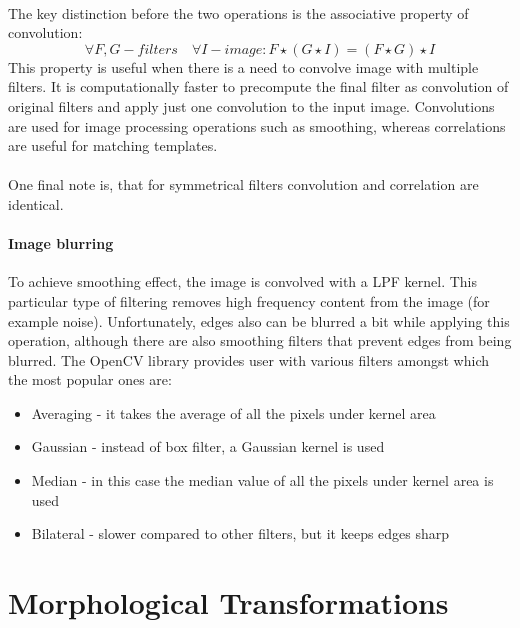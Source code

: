 \paragraph{}
The key distinction before the two operations is the associative property of convolution:
\begin{equation}
	\forall F, G - filters \quad \forall I - image: F \star (G \star I) = (F \star G) \star I
\end{equation}
This property is useful when there is a need to convolve image with multiple filters. It is computationally faster to precompute the final filter as convolution of original filters and apply just one convolution to the input image. Convolutions are used for image processing operations such as smoothing, whereas correlations are useful for matching templates.

\paragraph{}
One final note is, that for symmetrical filters convolution and correlation are identical.

\paragraph{Image blurring}
To achieve smoothing effect, the image is convolved with a LPF kernel. This particular type of filtering removes high frequency content from the image (for example noise). Unfortunately, edges also can be blurred a bit while applying this operation, although there are also smoothing filters that prevent edges from being blurred. The OpenCV library provides user with various filters amongst which the most popular ones are:
\begin{itemize}
	\item Averaging - it takes the average of all the pixels under kernel area
	\item Gaussian - instead of box filter, a Gaussian kernel is used
	\item Median - in this case the median value of all the pixels under kernel area is used
	\item Bilateral - slower compared to other filters, but it keeps edges sharp
\end{itemize}

\section{Morphological Transformations}
